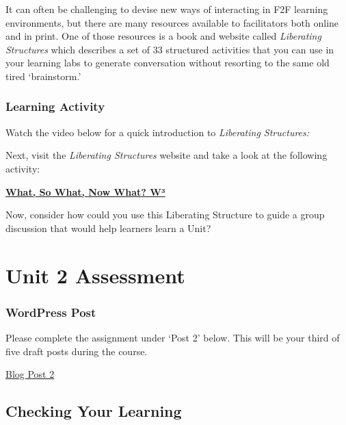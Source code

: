 \documentclass[
]{book}
\begin{document}
It can often be challenging to devise new ways of interacting in F2F learning environments, but there are many resources available to facilitators both online and in print. One of those resources is a book and website called \emph{Liberating Structures} which describes a set of 33 structured activities that you can use in your learning labs to generate conversation without resorting to the same old tired `brainstorm.'

\begin{reflect}
\hypertarget{learning-activity-8}{%
\subsubsection*{Learning Activity}\label{learning-activity-8}}

Watch the video below for a quick introduction to \emph{Liberating Structures:}

Next, visit the \emph{Liberating Structures} website and take a look at the following activity:

\href{http://www.liberatingstructures.com/9-what-so-what-now-what-w/}{\textbf{What, So What, Now What? W³}}

Now, consider how could you use this Liberating Structure to guide a group discussion that would help learners learn a Unit?
\end{reflect}

\hypertarget{unit-2-assessment}{%
\section*{Unit 2 Assessment}\label{unit-2-assessment}}

\begin{wp}
\hypertarget{wordpress-post}{%
\subsubsection{WordPress Post}\label{wordpress-post}}

Please complete the assignment under `Post 2' below. This will be your third of five draft posts during the course.

\href{https://ma-lead.github.io/ldrs663/assessments.html\#post-2}{Blog Post 2}
\end{wp}

\hypertarget{checking-your-learning}{%
\subsection*{Checking Your Learning}\label{checking-your-learning}}
\end{document}
